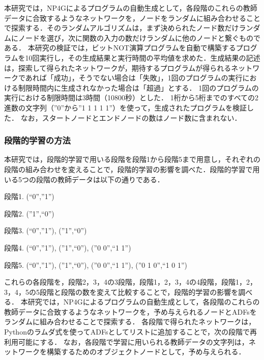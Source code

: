 \documentclass[exploratorypaper]{jsaiart} %
\begin{document}
本研究では，NP4Gによるプログラムの自動生成として，各段階のこれらの教師データに合致するようなネットワークを，ノードをランダムに組み合わせることで探索する．そのランダムアルゴリズムは，まず決められたノード数だけランダムにノードを選び，次に関数の入力の数だけランダムに他のノードと繋ぐものである．
本研究の検証では，ビットNOT演算プログラムを自動で構築するプログラムを10回実行し，その生成結果と実行時間の平均値を求めた．生成結果の記述は，探索して得られたネットワークが，期待するプログラムが得られるネットワークであれば「成功」，そうでない場合は「失敗」，1回のプログラムの実行における制限時間内に生成されなかった場合は「超過」とする．
1回のプログラムの実行における制限時間は3時間（10800秒）とした．
1桁から5桁までのすべての2進数の文字列（”0”から”1 1 1 1 1”）を使って，生成されたプログラムを検証した．
なお，スタートノードとエンドノードの数はノード数に含まれない．

\subsubsection{段階的学習の方法}
\label{sec:PLhow}
本研究では，段階的学習で用いる段階を段階1から段階5まで用意し，それぞれの段階の組み合わせを変えることで，段階的学習の影響を調べた．段階的学習で用いる5つの段階の教師データは以下の通りである．






段階1. (“0”,”1”)

段階2. (”1”,“0”)

段階3. (“0”,”1”), (”1”,“0”)

段階4. (“0”,”1”), (”1”,“0”), (”0 0”,“1 1”)

段階5. (“0”,”1”), (”1”,“0”), (”0 0”,“1 1”), (”0 1 0”,“1 0 1”)

これらの各段階を，段階2，3，4の3段階，段階1，2，3，4の4段階，段階1，2，3，4，5の5段階と段階の数を変えて比較することで，段階的学習の影響を調べる．
本研究では，NP4Gによるプログラムの自動生成として，各段階のこれらの教師データに合致するようなネットワークを，予め与えられるノードとADFsをランダムに組み合わせることで探索する．
各段階で得られたネットワークは，Pythonのラムダ式を使ってADFsとしてリストに追加することで，次の段階で再利用可能にする．
なお，各段階で学習に用いられる教師データの文字列は，ネットワークを構築するためのオブジェクトノードとして，予め与えられる．
\end{document}
